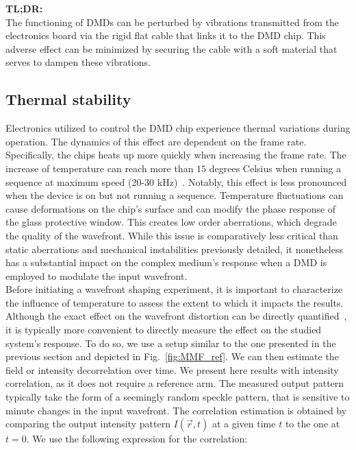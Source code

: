 \documentclass[12pt]{iopart}
\begin{document}
\begin{tldr}
  \textbf{TL;DR:}\\
  The functioning of DMDs can be perturbed by vibrations transmitted from the electronics board
  via the rigid flat cable that links it to the DMD chip.
  This adverse effect can be minimized by securing the cable with a soft material
  that serves to dampen these vibrations.
\end{tldr}

\subsection{Thermal stability}

Electronics utilized to control the DMD chip experience thermal variations during operation.
The dynamics of this effect are dependent on the frame rate.
Specifically, the chips heats up more quickly when increasing the frame rate.
The increase of temperature can reach more than $15$ degrees Celsius
when running a sequence at maximum speed (20-30 kHz)~\cite{Rudolf2021thermal}.
Notably, this effect is less pronounced when the device is on but not running a sequence.
Temperature fluctuations can cause deformations on the chip's surface
and can modify the phase response of the glass protective window.
This creates low order aberrations, which degrade the quality of the wavefront.
While this issue is comparatively less critical than static aberrations and mechanical instabilities
previously detailed,
it nonetheless has a substantial impact on the complex medium's response
when a DMD is employed to modulate the input wavefront.\\



Before initiating a wavefront shaping experiment,
it is important to characterize the influence of temperature
to assess the extent to which it impacts the results.
Although the exact effect on the wavefront distortion can be directly quantified~\cite{Rudolf2021thermal},
it is typically more convenient
to directly measure the effect on the studied system's response.
To do so, we use a setup similar to the one presented in the previous section
and depicted in Fig.~\ref{fig:MMF_ref}.
We can then estimate the field or intensity decorrelation over time.
We present here results with intensity correlation, as it does not require a reference arm.
The measured output pattern typically take the form of a seemingly random speckle pattern,
that is sensitive to minute changes in the input wavefront.
The correlation estimation is obtained by comparing the output intensity pattern
$I(\vec{r}, t)$ at a given time $t$
to the one at $t=0$.
We use the following expression for the correlation:
\end{document}
